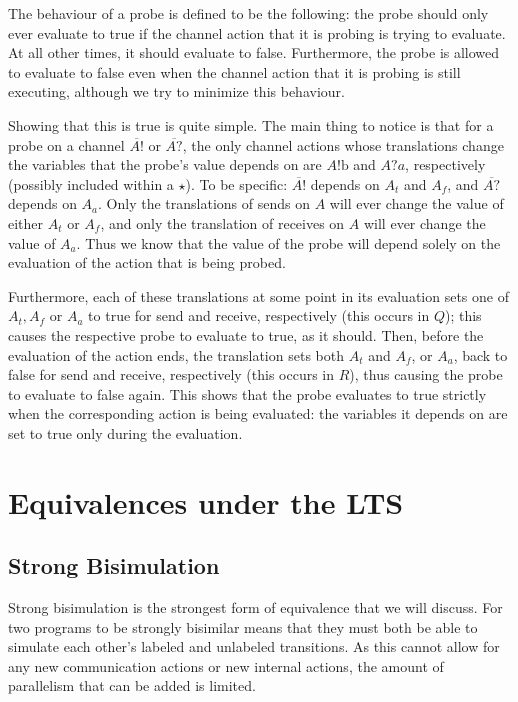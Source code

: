 \documentclass[times, 10pt]{article}
\begin{document}
The behaviour of a probe is defined to be the following: the probe should only
ever evaluate to true if the channel action that it is probing is trying to
evaluate. At all other times, it should evaluate to false. Furthermore, the
probe is allowed to evaluate to false even when the channel action that it is
probing is still executing, although we try to minimize this behaviour.

Showing that this is true is quite simple. The main thing to notice is that for
a probe on a channel $\overline{A!}$ or $\overline{A?}$, the only channel
actions whose translations change the variables that the probe's value depends
on are $A!\mathrm{b}$ and $A?a$, respectively (possibly included within a
$\star$). To be specific: $\overline{A!}$ depends on $A_t$ and $A_f$, and
$\overline{A?}$ depends on $A_a$. Only the translations of sends on $A$ will
ever change the value of either $A_t$ or $A_f$, and only the translation of
receives on $A$ will ever change the value of $A_a$. Thus we know that the value
of the probe will depend solely on the evaluation of the action that is being
probed. 

Furthermore, each of these translations at some point in its evaluation sets one
of $A_t, A_f$ or $A_a$ to true for send and receive, respectively (this occurs
in $Q$); this causes the respective probe to evaluate to true, as it should.
Then, before the evaluation of the action ends, the translation sets both $A_t$
and $A_f$, or $A_a$, back to false for send and receive, respectively (this
occurs in $R$), thus causing the probe to evaluate to false again. This shows
that the probe evaluates to true strictly when the corresponding action is being
evaluated: the variables it depends on are set to true only during the
evaluation.

\section{Equivalences under the LTS}

 
\subsection{Strong Bisimulation}

Strong bisimulation is the strongest form of equivalence that we will discuss.
For two programs to be strongly bisimilar means that they must both be able to
simulate each other's labeled and unlabeled transitions. As this cannot allow
for any new communication actions or new internal actions, the amount of
parallelism that can be added is limited.
\end{document}
